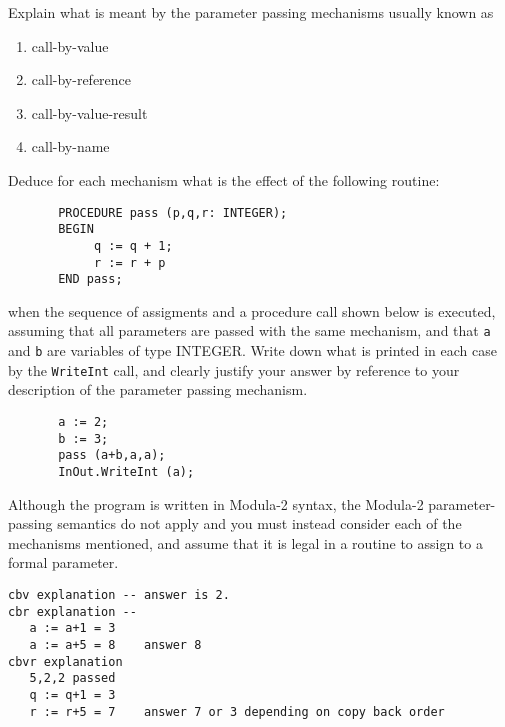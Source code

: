 \begin{questions}
\begin{subquestions}
\subquestion
Explain what is meant by the parameter passing mechanisms usually
        known as
                \begin{enumerate}
                \item call-by-value
                \item call-by-reference
                \item call-by-value-result
                \item call-by-name
                \end{enumerate}
        Deduce for each mechanism what is the effect of
        the following routine:
\begin{verbatim}
       PROCEDURE pass (p,q,r: INTEGER); 
       BEGIN
            q := q + 1;
            r := r + p
       END pass;
\end{verbatim}   
        when the sequence of assigments and a procedure call
        shown below is executed, assuming that all parameters are
        passed with the same mechanism, and that \verb"a" and
        \verb"b" are variables of type INTEGER.
        Write down what is printed in each case by the \verb"WriteInt"
        call, and clearly justify your answer by reference to your
        description of the parameter passing mechanism.
\begin{verbatim}
       a := 2;
       b := 3;
       pass (a+b,a,a);
       InOut.WriteInt (a);
\end{verbatim}
Although the program is written in Modula-2 syntax, the Modula-2
parameter-passing semantics do not apply and you must
instead consider each of the mechanisms mentioned, and assume
that it is legal in a routine to assign to a formal parameter.
\begin{modelanswer}
\begin{verbatim}
cbv explanation -- answer is 2.
cbr explanation -- 
   a := a+1 = 3
   a := a+5 = 8    answer 8
cbvr explanation
   5,2,2 passed
   q := q+1 = 3
   r := r+5 = 7    answer 7 or 3 depending on copy back order
\end{verbatim}
\end{modelanswer}

\end{subquestions}

\end{questions}




